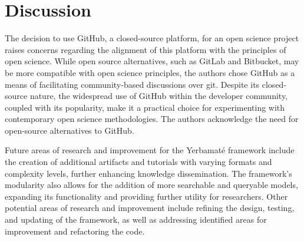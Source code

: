 \section{Discussion}

The decision to use GitHub, a closed-source platform, for an open science project raises concerns regarding the alignment of this platform with the principles of open science. While open source alternatives, such as GitLab and Bitbucket, may be more compatible with open science principles, the authors chose GitHub as a means of facilitating community-based discussions over git. Despite its closed-source nature, the widespread use of GitHub within the developer community, coupled with its popularity, make it a practical choice for experimenting with contemporary open science methodologies. The authors acknowledge the need for open-source alternatives to GitHub. 

Future areas of research and improvement for the Yerbamaté framework include the creation of additional artifacts and tutorials with varying formats and complexity levels, further enhancing knowledge dissemination. The framework's modularity also allows for the addition of more searchable and queryable models, expanding its functionality and providing further utility for researchers. Other potential areas of research and improvement include refining the design, testing, and updating of the framework, as well as addressing identified areas for improvement and refactoring the code.
